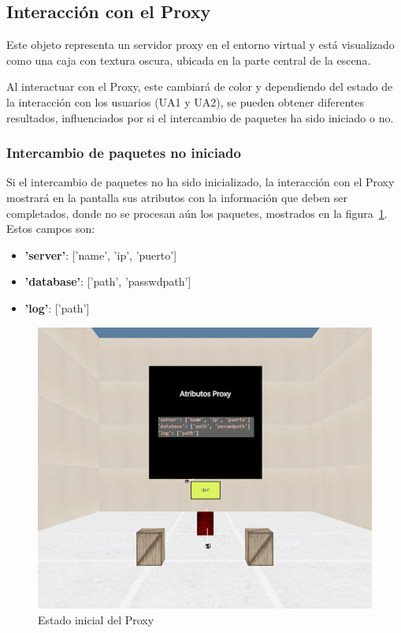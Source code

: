 \documentclass[a4paper, 12pt]{book}
\begin{document}
\subsection{Interacción con el Proxy}
\label{subsec:objeto_proxy}

Este objeto representa un servidor proxy en el entorno virtual y está visualizado como una caja con textura oscura,
ubicada en la parte central de la escena.

Al interactuar con el Proxy, este cambiará de color y dependiendo del estado de la interacción con los usuarios (UA1 y UA2), 
se pueden obtener diferentes resultados, influenciados por si el intercambio de paquetes ha sido iniciado o no.

\subsubsection{Intercambio de paquetes no iniciado}
\label{subsubsec:Proxy_Intercambio_NoIniciado}
Si el intercambio de paquetes no ha sido inicializado, la interacción con el Proxy mostrará en la pantalla sus atributos 
con la información que deben ser completados, donde no se procesan aún los paquetes, mostrados en la figura~\ref{fig:Proxy_NoIniciado}. Estos campos son:

\begin{itemize}
  \item \textbf{'server'}: ['name', 'ip', 'puerto']
  \item \textbf{'database'}: ['path', 'passwdpath']
  \item \textbf{'log'}: ['path']
\end{itemize}

\begin{figure}
  \centering
  \includegraphics[width=15cm, keepaspectratio]{img/resultados/Proxy_NoIniciado.png}
  \caption{Estado inicial del Proxy}
  \label{fig:Proxy_NoIniciado}
\end{figure}
\end{document}
